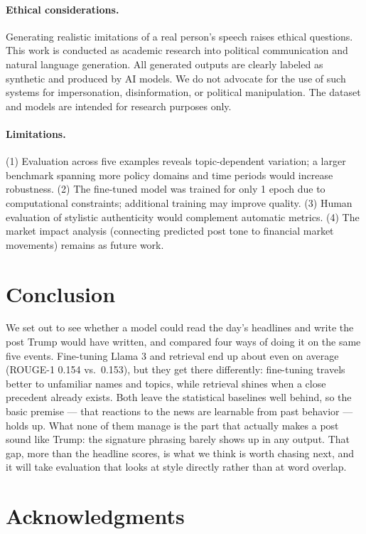 \documentclass[11pt,a4paper]{article}
\begin{document}
\paragraph{Ethical considerations.}
Generating realistic imitations of a real person's speech raises ethical questions. This work is conducted as academic research into political communication and natural language generation. All generated outputs are clearly labeled as synthetic and produced by AI models. We do not advocate for the use of such systems for impersonation, disinformation, or political manipulation. The dataset and models are intended for research purposes only.

\paragraph{Limitations.}
(1) Evaluation across five examples reveals topic-dependent variation; a larger benchmark spanning more policy domains and time periods would increase robustness. (2) The fine-tuned model was trained for only 1 epoch due to computational constraints; additional training may improve quality. (3) Human evaluation of stylistic authenticity would complement automatic metrics. (4) The market impact analysis (connecting predicted post tone to financial market movements) remains as future work.

\section{Conclusion}

We set out to see whether a model could read the day's headlines and write the post Trump would have written, and compared four ways of doing it on the same five events. Fine-tuning Llama 3 and retrieval end up about even on average (ROUGE-1 0.154 vs.\ 0.153), but they get there differently: fine-tuning travels better to unfamiliar names and topics, while retrieval shines when a close precedent already exists. Both leave the statistical baselines well behind, so the basic premise --- that reactions to the news are learnable from past behavior --- holds up. What none of them manage is the part that actually makes a post sound like Trump: the signature phrasing barely shows up in any output. That gap, more than the headline scores, is what we think is worth chasing next, and it will take evaluation that looks at style directly rather than at word overlap.

\section*{Acknowledgments}
\end{document}
